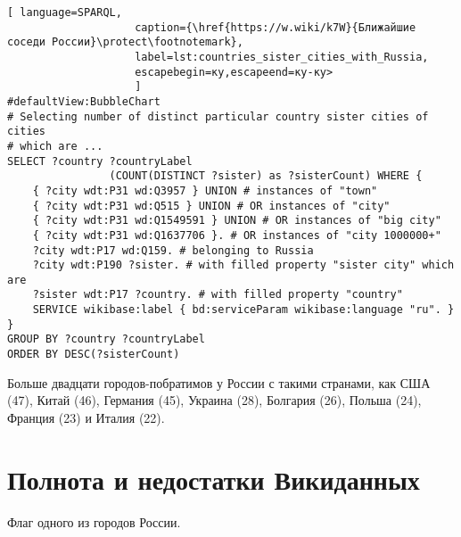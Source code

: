 \begin{lstlisting}[ language=SPARQL, 
                    caption={\href{https://w.wiki/k7W}{Ближайшие соседи России}\protect\footnotemark},
                    label=lst:countries_sister_cities_with_Russia, 
                    escapebegin=ку,escapeend=ку-ку>
                    ]
#defaultView:BubbleChart
# Selecting number of distinct particular country sister cities of cities 
# which are ...
SELECT ?country ?countryLabel 
				(COUNT(DISTINCT ?sister) as ?sisterCount) WHERE {                                                
	{ ?city wdt:P31 wd:Q3957 } UNION # instances of "town"
	{ ?city wdt:P31 wd:Q515 } UNION # OR instances of "city"
	{ ?city wdt:P31 wd:Q1549591 } UNION # OR instances of "big city"
	{ ?city wdt:P31 wd:Q1637706 }. # OR instances of "city 1000000+"                                 
	?city wdt:P17 wd:Q159. # belonging to Russia
	?city wdt:P190 ?sister. # with filled property "sister city" which are
	?sister wdt:P17 ?country. # with filled property "country"
	SERVICE wikibase:label { bd:serviceParam wikibase:language "ru". }
}
GROUP BY ?country ?countryLabel
ORDER BY DESC(?sisterCount)
\end{lstlisting}

Больше двадцати городов-побратимов у России с такими странами, как США (47), Китай (46), Германия (45), Украина (28), Болгария (26), Польша (24), Франция (23) и Италия (22).

\section{Полнота и недостатки Викиданных}


\begin{marginfigure}[0.0cm]
{
\setlength{\fboxsep}{0pt}%
\setlength{\fboxrule}{1pt}%
%
}
  \caption{Флаг одного из городов России.}%
  \label{fig:flag_question_city}%
\end{marginfigure}


